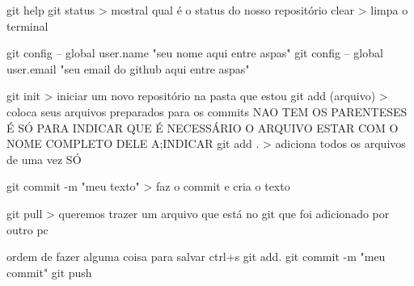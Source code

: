 
git help
git status > mostral qual é o status do nosso repositório
clear > limpa o terminal

git config -- global user.name "seu nome aqui entre aspas"
git config -- global user.email "seu email do github aqui entre aspas"

git init > iniciar um novo repositório na pasta que estou
git add (arquivo) > coloca seus arquivos preparados para os commits NAO TEM OS PARENTESES É SÓ PARA INDICAR QUE É NECESSÁRIO O ARQUIVO ESTAR COM O NOME COMPLETO DELE A;INDICAR
git add . > adiciona todos os arquivos de uma vez SÓ

git commit -m "meu texto" > faz o commit e cria  o texto

git pull > queremos trazer um arquivo que está no git que foi adicionado por outro pc


ordem de fazer alguma coisa para salvar
ctrl+s
git add.
git commit -m  "meu  commit"
git push